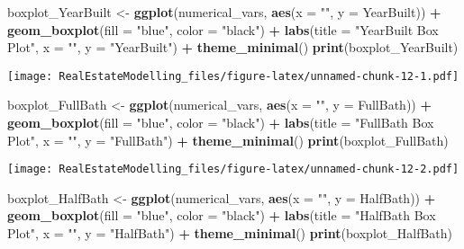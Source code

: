 \documentclass[
]{article}
\newenvironment{Shaded}{\begin{snugshade}}{\end{snugshade}}
\newcommand{\AttributeTok}[1]{\textcolor[rgb]{0.13,0.29,0.53}{#1}}
\newcommand{\FunctionTok}[1]{\textcolor[rgb]{0.13,0.29,0.53}{\textbf{#1}}}
\newcommand{\NormalTok}[1]{#1}
\newcommand{\OtherTok}[1]{\textcolor[rgb]{0.56,0.35,0.01}{#1}}
\newcommand{\SpecialCharTok}[1]{\textcolor[rgb]{0.81,0.36,0.00}{\textbf{#1}}}
\newcommand{\StringTok}[1]{\textcolor[rgb]{0.31,0.60,0.02}{#1}}
\begin{document}
\begin{Shaded}
\begin{Highlighting}[]
\NormalTok{boxplot\_YearBuilt }\OtherTok{\textless{}{-}} \FunctionTok{ggplot}\NormalTok{(numerical\_vars, }\FunctionTok{aes}\NormalTok{(}\AttributeTok{x =} \StringTok{""}\NormalTok{, }\AttributeTok{y =}\NormalTok{ YearBuilt)) }\SpecialCharTok{+}
  \FunctionTok{geom\_boxplot}\NormalTok{(}\AttributeTok{fill =} \StringTok{"blue"}\NormalTok{, }\AttributeTok{color =} \StringTok{"black"}\NormalTok{) }\SpecialCharTok{+}
  \FunctionTok{labs}\NormalTok{(}\AttributeTok{title =} \StringTok{"YearBuilt Box Plot"}\NormalTok{, }\AttributeTok{x =} \StringTok{""}\NormalTok{, }\AttributeTok{y =} \StringTok{"YearBuilt"}\NormalTok{) }\SpecialCharTok{+}
  \FunctionTok{theme\_minimal}\NormalTok{()}
\FunctionTok{print}\NormalTok{(boxplot\_YearBuilt)}
\end{Highlighting}
\end{Shaded}

\texttt{[image: RealEstateModelling\_files/figure-latex/unnamed-chunk-12-1.pdf]}

\begin{Shaded}
\begin{Highlighting}[]
\NormalTok{boxplot\_FullBath }\OtherTok{\textless{}{-}} \FunctionTok{ggplot}\NormalTok{(numerical\_vars, }\FunctionTok{aes}\NormalTok{(}\AttributeTok{x =} \StringTok{""}\NormalTok{, }\AttributeTok{y =}\NormalTok{ FullBath)) }\SpecialCharTok{+}
  \FunctionTok{geom\_boxplot}\NormalTok{(}\AttributeTok{fill =} \StringTok{"blue"}\NormalTok{, }\AttributeTok{color =} \StringTok{"black"}\NormalTok{) }\SpecialCharTok{+}
  \FunctionTok{labs}\NormalTok{(}\AttributeTok{title =} \StringTok{"FullBath Box Plot"}\NormalTok{, }\AttributeTok{x =} \StringTok{""}\NormalTok{, }\AttributeTok{y =} \StringTok{"FullBath"}\NormalTok{) }\SpecialCharTok{+}
  \FunctionTok{theme\_minimal}\NormalTok{()}
\FunctionTok{print}\NormalTok{(boxplot\_FullBath)}
\end{Highlighting}
\end{Shaded}

\texttt{[image: RealEstateModelling\_files/figure-latex/unnamed-chunk-12-2.pdf]}

\begin{Shaded}
\begin{Highlighting}[]
\NormalTok{boxplot\_HalfBath }\OtherTok{\textless{}{-}} \FunctionTok{ggplot}\NormalTok{(numerical\_vars, }\FunctionTok{aes}\NormalTok{(}\AttributeTok{x =} \StringTok{""}\NormalTok{, }\AttributeTok{y =}\NormalTok{ HalfBath)) }\SpecialCharTok{+}
  \FunctionTok{geom\_boxplot}\NormalTok{(}\AttributeTok{fill =} \StringTok{"blue"}\NormalTok{, }\AttributeTok{color =} \StringTok{"black"}\NormalTok{) }\SpecialCharTok{+}
  \FunctionTok{labs}\NormalTok{(}\AttributeTok{title =} \StringTok{"HalfBath Box Plot"}\NormalTok{, }\AttributeTok{x =} \StringTok{""}\NormalTok{, }\AttributeTok{y =} \StringTok{"HalfBath"}\NormalTok{) }\SpecialCharTok{+}
  \FunctionTok{theme\_minimal}\NormalTok{()}
\FunctionTok{print}\NormalTok{(boxplot\_HalfBath)}
\end{Highlighting}
\end{Shaded}
\end{document}
